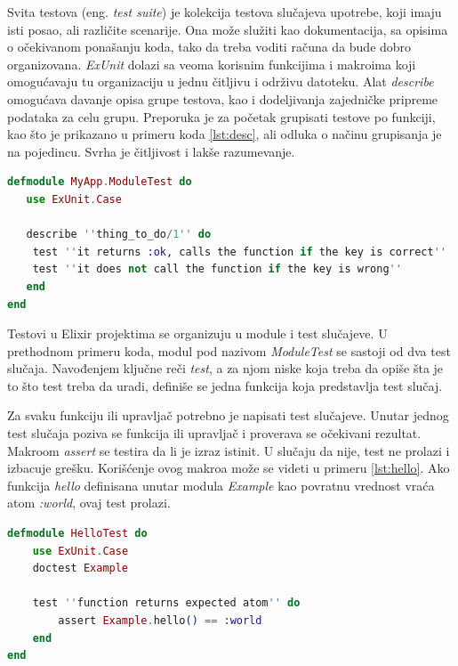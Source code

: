 \documentclass[12pt,oneside]{memoir}
\begin{document}
\par Svita testova (eng. \emph{test suite}) je kolekcija testova slučajeva upotrebe, koji imaju isti posao, ali različite scenarije. Ona može služiti kao dokumentacija, sa opisima o očekivanom ponašanju koda, tako da treba voditi računa da bude dobro organizovana. \emph{ExUnit} dolazi sa veoma korisnim funkcijima i makroima koji omogućavaju tu organizaciju u jednu čitljivu i održivu  datoteku. Alat \emph{describe} omogućava davanje opisa grupe testova, kao i dodeljivanja zajedničke pripreme podataka za celu grupu. Preporuka je za početak grupisati testove po funkciji, kao što je prikazano u primeru koda \ref{lst:desc}, ali odluka o načinu grupisanja je na pojedincu. Svrha je čitljivost i lakše razumevanje. 

\begin{lstlisting}[language=elixir, caption={Opisivanje testova unutar jedne grupe},captionpos=b, label={lst:desc}]
defmodule MyApp.ModuleTest do 
   use ExUnit.Case 
   
   describe ''thing_to_do/1'' do
   	test ''it returns :ok, calls the function if the key is correct''
   	test ''it does not call the function if the key is wrong''
   end
end
\end{lstlisting}

\par Testovi u Elixir projektima se organizuju u module i test slučajeve. U prethodnom primeru koda, modul pod nazivom \emph{ModuleTest} se sastoji od dva test slučaja. Navođenjem ključne reči \emph{test}, a za njom niske koja treba da opiše šta je to što test treba da uradi, definiše se jedna funkcija koja predstavlja test slučaj.
\par Za svaku funkciju ili upravljač potrebno je napisati test slučajeve. Unutar jednog test slučaja poziva se funkcija ili upravljač i proverava se očekivani rezultat. Makroom \emph{assert} se testira da li je izraz istinit. U slučaju da nije, test ne prolazi i izbacuje grešku. Korišćenje ovog makroa može se videti u primeru \ref{lst:hello}.  Ako funkcija \emph{hello} definisana unutar modula \emph{Example} kao povratnu vrednost vraća atom \emph{:world}, ovaj test prolazi.

\begin{lstlisting}[language=elixir, caption={Testiranje jednostavne funkcije},captionpos=b, label={lst:hello}]
defmodule HelloTest do
    use ExUnit.Case
    doctest Example
    
    test ''function returns expected atom'' do
    	assert Example.hello() == :world
    end
end
\end{lstlisting}
\end{document}
